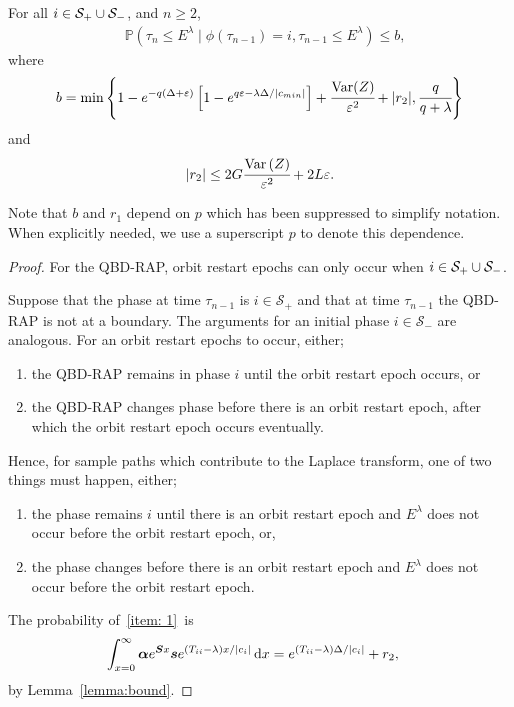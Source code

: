 \begin{lem}\label{lem: another bound}
	For all \(i\in\mathcal S_+\cup \mathcal{S}_-\), and \(n\geq 2\),
	\begin{align}
		&\mathbb P(\tau_n\leq E^\lambda \mid \phi(\tau_{n-1})=i, \tau_{n-1}\leq  E^\lambda ) \leq b,
	\end{align}
	where 
	\[b = \min\left\{1-e^{-q(\Delta+\varepsilon)}\left[1-e^{q\varepsilon-\lambda \Delta/|c_{min}|}\right] + \cfrac{\mathrm{Var}(Z)}{\varepsilon^2} + |r_2|,\cfrac{q}{q+\lambda}\right\}\]
	and  
	\[|r_2|\leq 2G\cfrac{\mathrm{Var} \left(Z\right)}{\varepsilon^2} + 2L\varepsilon.\]
\end{lem}
Note that \(b\) and \(r_1\) depend on \(p\) which has been suppressed to simplify notation. When explicitly needed, we use a superscript \(p\) to denote this dependence.  
\begin{proof}
	For the QBD-RAP, orbit restart epochs can only occur when \(i\in\mathcal S_+\cup\mathcal{S}_-\). 
	
	Suppose that the phase at time \(\tau_{n-1}\) is \(i\in\mathcal S_+\) and that at time \(\tau_{n-1}\) the QBD-RAP is not at a boundary. The arguments for an initial phase \(i\in\mathcal S_-\) are analogous. For an orbit restart epochs to occur, either; 
	\begin{enumerate}
		\item the QBD-RAP remains in phase \(i\) until the orbit restart epoch occurs, or
		\item the QBD-RAP changes phase before there is an orbit restart epoch, after which the orbit restart epoch occurs eventually. 
	\end{enumerate}
	
	Hence, for sample paths which contribute to the Laplace transform, one of two things must happen, either; 
	\begin{enumerate}
		\item the phase remains \(i\) until there is an orbit restart epoch and \(E^\lambda\) does not occur before the orbit restart epoch, or, \label{item: 1}
		\item the phase changes before there is an orbit restart epoch and \(E^\lambda\) does not occur before the orbit restart epoch. \label{item: 2}
	\end{enumerate}
	
	The probability of~\ref{item: 1}~is 
	\begin{align}
		\int_{x=0}^\infty \boldsymbol \alpha e^{\boldsymbol{S}x}\boldsymbol s e^{(T_{ii}-\lambda)x/|c_i|}\, \mathrm{d} x 
		&= e^{(T_{ii}-\lambda)\Delta/|c_i|} + r_2,\label{eqn: bnd this 12345}
	\end{align}
	by Lemma~\ref{lemma:bound}.
	

\end{proof}
